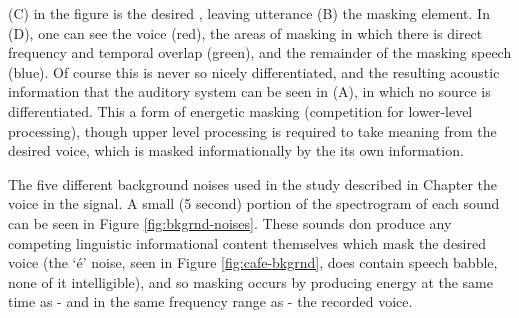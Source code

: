 \DIFdelbegin {}\DIFdelend \DIFaddbegin {}\DIFaddend (C) in the figure is the desired \DIFdelbegin {}\DIFdelend \DIFaddbegin {}\DIFaddend , leaving utterance (B) the masking element.  In (D), one can see the voice (red), the areas of masking in which there is direct frequency and temporal overlap (green), and the remainder of the masking speech (blue). Of course this is never so nicely differentiated, and the resulting acoustic information that the auditory system \DIFdelbegin {}\DIFdelend \DIFaddbegin {}\DIFaddend can be seen in (A), in which no source is differentiated.  This \DIFdelbegin {}\DIFdelend \DIFaddbegin {}\DIFaddend a form of energetic masking (competition for lower-level processing), though upper level processing is required to take meaning from the desired voice, which is masked informationally by the \DIFdelbegin {}\DIFdelend \DIFaddbegin {}\DIFaddend its own information.

The five different background noises used in the study described in Chapter \DIFdelbegin {}\DIFdelend \DIFaddbegin {}\DIFaddend the voice in the signal.  A small (5 second) portion of the spectrogram of each sound can be seen in Figure \ref{fig:bkgrnd-noises}.  These sounds don \DIFdelbegin {}\DIFdelend \DIFaddbegin {}\DIFaddend produce any competing linguistic informational content themselves which mask the desired voice (the `\DIFdelbegin {}\DIFdelend \DIFaddbegin {}\'{e}\DIFaddend ' noise, seen in Figure \ref{fig:cafe-bkgrnd}, does contain speech babble, none of it intelligible), and so masking occurs by producing energy at the same time as - and in the same frequency range as - the recorded voice.

